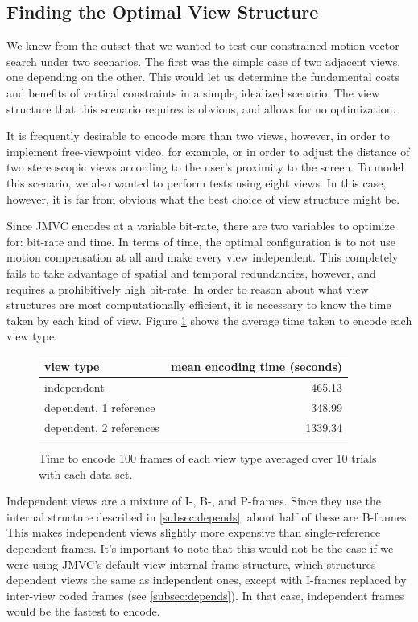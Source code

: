 \documentclass{sig-alternate-05-2015}
\begin{document}
\subsection{Finding the Optimal View Structure}
\label{subsec:optimal}
We knew from the outset that we wanted to test our constrained motion-vector
search under two scenarios. The first was the simple case of two adjacent views,
one depending on the other. This would let us determine the fundamental costs
and benefits of vertical constraints in a simple, idealized scenario. The view
structure that this scenario requires is obvious, and allows for no
optimization.

It is frequently desirable to encode more than two views, however, in order to
implement free-viewpoint video, for example, or in order to adjust the distance
of two stereoscopic views according to the user's proximity to the screen. To
model this scenario, we also wanted to perform tests using eight views. In this
case, however, it is far from obvious what the best choice of view structure
might be.

Since JMVC encodes at a variable bit-rate, there are two variables to optimize
for: bit-rate and time. In terms of time, the optimal configuration is to not
use motion compensation at all and make every view independent. This completely
fails to take advantage of spatial and temporal redundancies, however, and
requires a prohibitively high bit-rate. In order to reason about what view
structures are most computationally efficient, it is necessary to know the
time taken by each kind of view. Figure \ref{fig:view-type-times} shows
the average time taken to encode each view type.

\begin{figure}
\centering
\begin{tabular}{|l|r|}
\hline
view type               & mean encoding time (seconds) \\
\hline
independent             & 465.13                       \\
dependent, 1 reference  & 348.99                       \\
dependent, 2 references & 1339.34                      \\
\hline
\end{tabular}
\caption{Time to encode 100 frames of each view type averaged over 10 trials
with each data-set.}
\label{fig:view-type-times}
\end{figure}

Independent views are a mixture of I-, B-, and P-frames. Since they use the
internal structure described in \ref{subsec:depends}, about half of these
are B-frames. This makes independent views slightly more expensive than
single-reference dependent frames. It's important to note that this would not be
the case if we were using JMVC's default view-internal frame structure, which
structures dependent views the same as independent ones, except with I-frames
replaced by inter-view coded frames (see \ref{subsec:depends}). In that case,
independent frames would be the fastest to encode.
\end{document}
